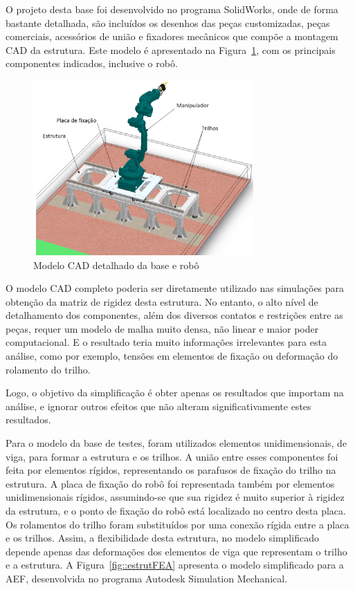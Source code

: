 O projeto desta base foi desenvolvido no programa SolidWorks, onde de forma
bastante detalhada, são incluídos os desenhos das peças customizadas, peças
comerciais, acessórios de união e fixadores mecânicos que compõe a montagem CAD
da estrutura. Este modelo é apresentado na Figura~\ref{fig::estrutCAD}, com os
principais componentes indicados, inclusive o robô.

\begin{figure}[h]
	\centering 
 	\includegraphics[width=0.75\textwidth]{figs/estrutCAD}
 	\caption{Modelo CAD detalhado da base e robô}
 	\label{fig::estrutCAD}
\end{figure}

O modelo CAD completo poderia ser diretamente utilizado nas
simulações para obtenção da matriz de rigidez desta estrutura. No entanto, o
alto nível de detalhamento dos componentes, além dos diversos contatos e
restrições entre as peças, requer um modelo de malha muito densa, não linear e
maior poder computacional. E o resultado teria muito informações irrelevantes
para esta análise, como por exemplo, tensões em elementos de fixação ou
deformação do rolamento do trilho.

Logo, o objetivo da simplificação é obter apenas os resultados que importam
na análise, e ignorar outros efeitos que não alteram significativamente
estes resultados. 

Para o modelo da base de testes, foram utilizados elementos unidimensionais, de
viga, para formar a estrutura e os trilhos. A união entre esses componentes foi
feita por elementos rígidos, representando os parafusos de fixação do trilho na
estrutura. A placa de fixação do robô foi representada também por elementos
unidimensionais rígidos, assumindo-se que sua rigidez é muito superior à rigidez
da estrutura, e o ponto de fixação do robô está localizado no centro desta
placa.
Os rolamentos do trilho foram substituídos por uma conexão rígida entre a placa
e os trilhos. Assim, a flexibilidade desta estrutura, no modelo simplificado
depende apenas das deformações dos elementos de viga que representam o trilho e
a estrutura. A Figura~\ref{fig::estrutFEA} apresenta o modelo simplificado para
a AEF, desenvolvida no programa Autodesk Simulation Mechanical.


